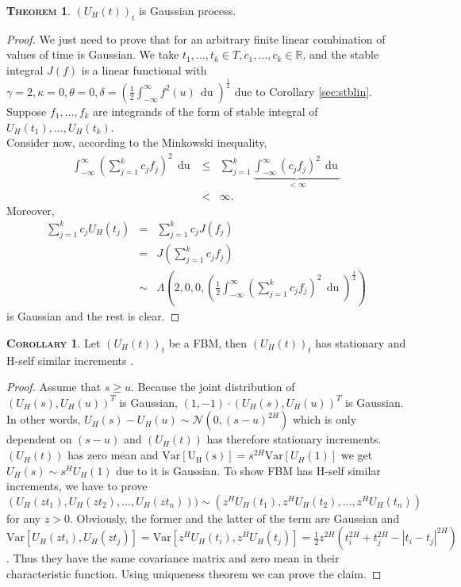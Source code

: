 \documentclass[a4paper, twoside, 11pt]{article}
\theoremstyle{definition}
\newtheorem{theorem}[definition]{\scshape Theorem}
\newtheorem{corollary}[definition]{\scshape Corollary}
\begin{document}
\begin{theorem}
  $(U_H(t))_{t}$ is Gaussian process.
\end{theorem}

\begin{proof}
  We just need to prove that for an arbitrary finite linear combination of values of time is Gaussian. We take $t_1, \dots, t_k \in T, c_1, \dots, c_k \in \mathbb{R}$, and the stable integral $J(f) $ is a linear functional with $\gamma=2, \kappa=0, \theta=0, \delta= (\frac{1}{2}\int_{-\infty}^{\infty}f^2(u)\,\mathop{du})^{\frac{1}{2}}$ due to Corollary \ref{sec:stblin}. Suppose $f_1,\dots, f_k$ are integrands of the form of stable integral of $U_H(t_1), \dots, U_H(t_k)$. \\
  Consider now, according to the Minkowski inequality,
  \begin{eqnarray*}
	\int_{-\infty}^{\infty}(\sum_{j=1}^k c_jf_j)^2\,\mathop{du} &\le& \sum_{j=1}^k \underbrace{\int_{-\infty}^{\infty}(c_jf_j)^2\,\mathop{du}}_{<\infty}\\
	&<& \infty.
  \end{eqnarray*}
Moreover,
  \begin{eqnarray*}
	\sum_{j=1}^k c_jU_H(t_j) &=& \sum_{j=1}^k c_jJ(f_j)\\
	&=& J(\sum_{j=1}^k c_jf_j)\\
	&\sim& \Lambda(2, 0, 0, (\frac{1}{2}\int_{-\infty}^{\infty}(\sum_{j=1}^k c_jf_j)^2\,\mathop{du})^{\frac{1}{2}})
  \end{eqnarray*}
  is Gaussian and the rest is clear.
\end{proof}

\begin{corollary}
  Let $(U_H(t))_{t}$ be a FBM, then $(U_H(t))_{t}$ has stationary and H-self similar increments . 
\end{corollary}
\begin{proof}
 Assume that $s \ge u $. Because the joint distribution of $(U_H(s), U_H(u))^T$ is Gaussian, $(1, -1) \cdot (U_H(s), U_H(u))^T $ is Gaussian. In other words,  $U_H(s) - U_H(u) \sim \mathcal{N}(0, (s-u)^{2H})$ which is only dependent on $(s-u)$ and $(U_H(t))$ has therefore stationary increments.\\
   $(U_H(t))$ has zero mean and $\mathrm{Var[U_H(s)]} = s^{2H}\mathrm{Var}[U_H(1)]$ we get $U_H(s) \sim s^HU_H(1)$ due to it is Gaussian.
   To show FBM has H-self similar increments, we have to prove\\ $(U_H(zt_1), U_H(zt_2),\dots, U_H(zt_n))) \sim (z^HU_H(t_1), z^HU_H(t_2),\dots, z^HU_H(t_n))$ for any $z > 0$. Obviously, the former and the latter of the term are Gaussian and $\mathrm{Var}[U_H(zt_i), U_H(zt_j)] = \mathrm{Var}[z^HU_H(t_i), z^HU_H(t_j)] = \frac{1}{2}z^{2H}(t_i^{2H} + t_j^{2H} - |t_i-t_j|^{2H})$. Thus they have the same covariance matrix and zero mean in their characteristic function. Using uniqueness theorem we can prove the claim. 
\end{proof}
\end{document}
